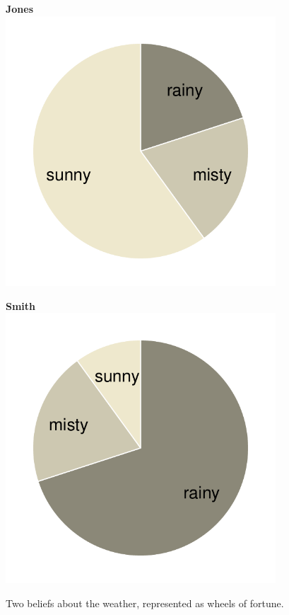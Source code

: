 \documentclass[nobib,nofonts]{tufte-handout}
\begin{document}
\begin{figure}
  \centering
  \begin{minipage}{0.45\linewidth}
    \centering
    \textbf{Jones}
    \includegraphics[width=0.9\textwidth]{00-pics/pie-chart-beliefs-Jones.pdf}
  \end{minipage}
  \hfill
  \begin{minipage}{0.45\linewidth}
    \centering
    \textbf{Smith}
    \includegraphics[width=0.9\textwidth]{00-pics/pie-chart-beliefs-Smith.pdf}
  \end{minipage}
  \caption{Two beliefs about the weather, represented as wheels of fortune.}
  \label{fig:belief-wheels}
\end{figure}
\end{document}
